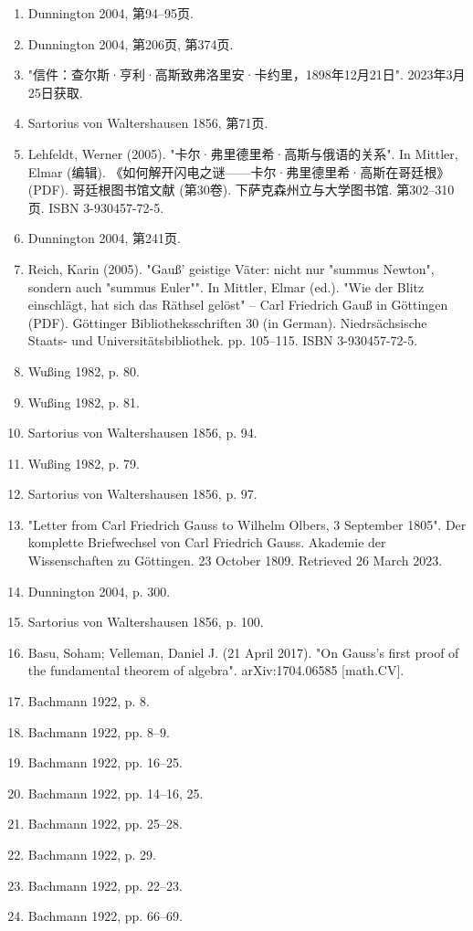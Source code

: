 \begin{enumerate}
\item Dunnington 2004, 第94–95页.  
\item Dunnington 2004, 第206页, 第374页.  
\item "信件：查尔斯·亨利·高斯致弗洛里安·卡约里，1898年12月21日". 2023年3月25日获取.  
\item Sartorius von Waltershausen 1856, 第71页.  
\item Lehfeldt, Werner (2005). "卡尔·弗里德里希·高斯与俄语的关系". In Mittler, Elmar (编辑). 《如何解开闪电之谜——卡尔·弗里德里希·高斯在哥廷根》 (PDF). 哥廷根图书馆文献 (第30卷). 下萨克森州立与大学图书馆. 第302–310页. ISBN 3-930457-72-5.  
\item Dunnington 2004, 第241页.
\item Reich, Karin (2005). "Gauß' geistige Väter: nicht nur "summus Newton", sondern auch "summus Euler"". In Mittler, Elmar (ed.). "Wie der Blitz einschlägt, hat sich das Räthsel gelöst" – Carl Friedrich Gauß in Göttingen (PDF). Göttinger Bibliotheksschriften 30 (in German). Niedrsächsische Staats- und Universitätsbibliothek. pp. 105–115. ISBN 3-930457-72-5.
\item Wußing 1982, p. 80.
\item Wußing 1982, p. 81.
\item Sartorius von Waltershausen 1856, p. 94.
\item Wußing 1982, p. 79.
\item Sartorius von Waltershausen 1856, p. 97.
\item "Letter from Carl Friedrich Gauss to Wilhelm Olbers, 3 September 1805". Der komplette Briefwechsel von Carl Friedrich Gauss. Akademie der Wissenschaften zu Göttingen. 23 October 1809. Retrieved 26 March 2023.
\item Dunnington 2004, p. 300.
\item Sartorius von Waltershausen 1856, p. 100.
\item Basu, Soham; Velleman, Daniel J. (21 April 2017). "On Gauss's first proof of the fundamental theorem of algebra". arXiv:1704.06585 [math.CV].
\item Bachmann 1922, p. 8.
\item Bachmann 1922, pp. 8–9.
\item Bachmann 1922, pp. 16–25.
\item Bachmann 1922, pp. 14–16, 25.
\item Bachmann 1922, pp. 25–28.
\item Bachmann 1922, p. 29.
\item Bachmann 1922, pp. 22–23.
\item Bachmann 1922, pp. 66–69.

\end{enumerate}
